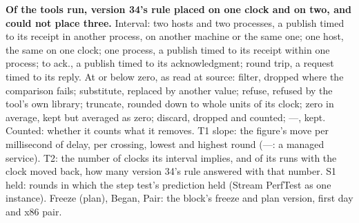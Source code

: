 \documentclass[10pt,journal,onecolumn]{IEEEtran}
\begin{document}
\begin{table}[tb]
\caption{\textbf{Of the tools run, version 34's rule placed \toolsOneClockWord{} on one clock and
\toolsTwoClockWord{} on two, and could not place three.} Interval: two hosts and two processes, a publish timed to
its receipt in another process, on another machine or the same one; one host, the same on one clock;
one process, a publish timed to its receipt within one process; to ack., a publish timed to its
acknowledgment; round trip, a request timed to its reply. At or below zero, as read at source:
filter, dropped where the comparison fails; substitute, replaced by another value; refuse, refused
by the tool's own library; truncate, rounded down to whole units of its clock; zero in average,
kept but averaged as zero; discard, dropped and counted; ---, kept. Counted: whether it counts what
it removes. T1 slope: the figure's move per millisecond of delay, per crossing, lowest and highest
round (---: a managed service). T2: the number of clocks its interval implies, and of its runs with
the clock moved back, how many version 34's rule answered with that number. S1 held:
rounds in which the step test's prediction held (Stream PerfTest as one instance). Freeze (plan),
Began, Pair: the block's freeze and plan version, first day and x86 pair.}
\label{stab:toolsrun}
\centering
\footnotesize
\setlength{\tabcolsep}{4pt}

\end{table}
\end{document}

